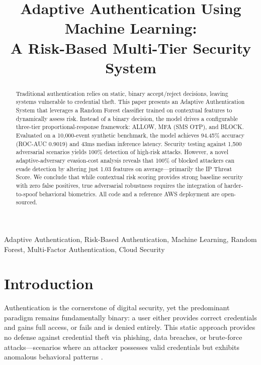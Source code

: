\documentclass[conference]{IEEEtran}
\begin{document}
\title{Adaptive Authentication Using Machine Learning:\\
A Risk-Based Multi-Tier Security System}

\author{
}

\maketitle

\begin{abstract}
Traditional authentication relies on static, binary accept/reject decisions, leaving systems vulnerable to credential theft. This paper presents an Adaptive Authentication System that leverages a Random Forest classifier trained on contextual features to dynamically assess risk. Instead of a binary decision, the model drives a configurable three-tier proportional-response framework: ALLOW, MFA (SMS OTP), and BLOCK. Evaluated on a 10,000-event synthetic benchmark, the model achieves 94.45\% accuracy (ROC-AUC 0.9019) and 43ms median inference latency. Security testing against 1,500 adversarial scenarios yields 100\% detection of high-risk attacks. However, a novel adaptive-adversary evasion-cost analysis reveals that 100\% of blocked attackers can evade detection by altering just 1.03 features on average---primarily the IP Threat Score. We conclude that while contextual risk scoring provides strong baseline security with zero false positives, true adversarial robustness requires the integration of harder-to-spoof behavioral biometrics. All code and a reference AWS deployment are open-sourced.
\end{abstract}

\begin{IEEEkeywords}
Adaptive Authentication, Risk-Based Authentication, Machine Learning, Random Forest, Multi-Factor Authentication, Cloud Security
\end{IEEEkeywords}

\section{Introduction}
Authentication is the cornerstone of digital security, yet the predominant paradigm remains fundamentally binary: a user either provides correct credentials and gains full access, or fails and is denied entirely. This static approach provides no defense against credential theft via phishing, data breaches, or brute-force attacks---scenarios where an attacker possesses valid credentials but exhibits anomalous behavioral patterns \cite{freeman2016}.
\end{document}
